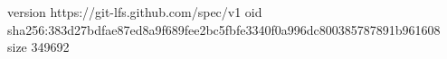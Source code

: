 version https://git-lfs.github.com/spec/v1
oid sha256:383d27bdfae87ed8a9f689fee2bc5fbfe3340f0a996dc800385787891b961608
size 349692
